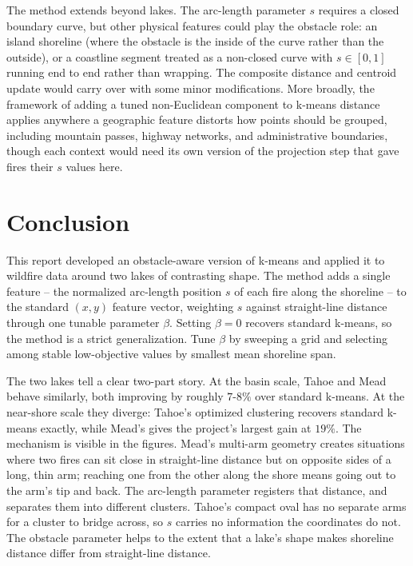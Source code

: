 \documentclass[11pt]{article}
\begin{document}
The method extends beyond lakes. The arc-length parameter $s$ requires a closed boundary curve, but other physical features could play the obstacle role: an island shoreline (where the obstacle is the inside of the curve rather than the outside), or a coastline segment treated as a non-closed curve with $s \in [0, 1]$ running end to end rather than wrapping. The composite distance and centroid update would carry over with some minor modifications. More broadly, the framework of adding a tuned non-Euclidean component to k-means distance applies anywhere a geographic feature distorts how points should be grouped, including mountain passes, highway networks, and administrative boundaries, though each context would need its own version of the projection step that gave fires their $s$ values here.
 


\section{Conclusion}

This report developed an obstacle-aware version of k-means and applied it to wildfire data around two lakes of contrasting shape. The method adds a single feature -- the normalized arc-length position $s$ of each fire along the shoreline -- to the standard $(x, y)$ feature vector, weighting $s$ against straight-line distance through one tunable parameter $\beta$. Setting $\beta = 0$ recovers standard k-means, so the method is a strict generalization. Tune $\beta$ by sweeping a grid and selecting among stable low-objective values by smallest mean shoreline span.

The two lakes tell a clear two-part story. At the basin scale, Tahoe and Mead behave similarly, both improving by roughly $7$-$8\%$ over standard k-means. At the near-shore scale they diverge: Tahoe's optimized clustering recovers standard k-means exactly, while Mead's gives the project's largest gain at $19\%$. The mechanism is visible in the figures. Mead's multi-arm geometry creates situations where two fires can sit close in straight-line distance but on opposite sides of a long, thin arm; reaching one from the other along the shore means going out to the arm's tip and back. The arc-length parameter registers that distance, and separates them into different clusters. Tahoe's compact oval has no separate arms for a cluster to bridge across, so $s$ carries no information the coordinates do not. The obstacle parameter helps to the extent that a lake's shape makes shoreline distance differ from straight-line distance.
\end{document}
